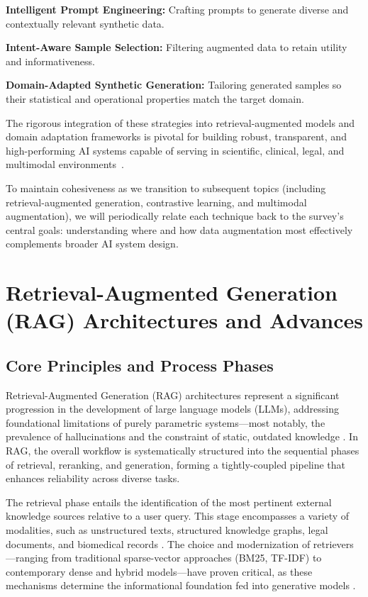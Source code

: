 \documentclass[sigconf]{acmart}
\begin{document}
\textbf{Intelligent Prompt Engineering:} Crafting prompts to generate diverse and contextually relevant synthetic data.

\textbf{Intent-Aware Sample Selection:} Filtering augmented data to retain utility and informativeness.

\textbf{Domain-Adapted Synthetic Generation:} Tailoring generated samples so their statistical and operational properties match the target domain.

The rigorous integration of these strategies into retrieval-augmented models and domain adaptation frameworks is pivotal for building robust, transparent, and high-performing AI systems capable of serving in scientific, clinical, legal, and multimodal environments~\cite{ref5,ref10,ref12,ref15,ref16,ref22,ref24,ref31,ref32,ref36,ref37,ref43,ref48,ref49,ref52,ref54,ref55,ref61,ref62,ref57}.

To maintain cohesiveness as we transition to subsequent topics (including retrieval-augmented generation, contrastive learning, and multimodal augmentation), we will periodically relate each technique back to the survey's central goals: understanding where and how data augmentation most effectively complements broader AI system design.

\section{Retrieval-Augmented Generation (RAG) Architectures and Advances}

\subsection{Core Principles and Process Phases}

Retrieval-Augmented Generation (RAG) architectures represent a significant progression in the development of large language models (LLMs), addressing foundational limitations of purely parametric systems—most notably, the prevalence of hallucinations and the constraint of static, outdated knowledge \cite{ref4, ref5, ref8, ref10, ref14, ref15, ref16, ref17, ref35, ref36, ref37, ref42, ref52, ref54, ref55, ref64}. In RAG, the overall workflow is systematically structured into the sequential phases of retrieval, reranking, and generation, forming a tightly-coupled pipeline that enhances reliability across diverse tasks.

The retrieval phase entails the identification of the most pertinent external knowledge sources relative to a user query. This stage encompasses a variety of modalities, such as unstructured texts, structured knowledge graphs, legal documents, and biomedical records \cite{ref42, ref49, ref51, ref52, ref54, ref55, ref63}. The choice and modernization of retrievers—ranging from traditional sparse-vector approaches (BM25, TF-IDF) to contemporary dense and hybrid models—have proven critical, as these mechanisms determine the informational foundation fed into generative models \cite{ref10, ref35, ref52, ref54}.
\end{document}
